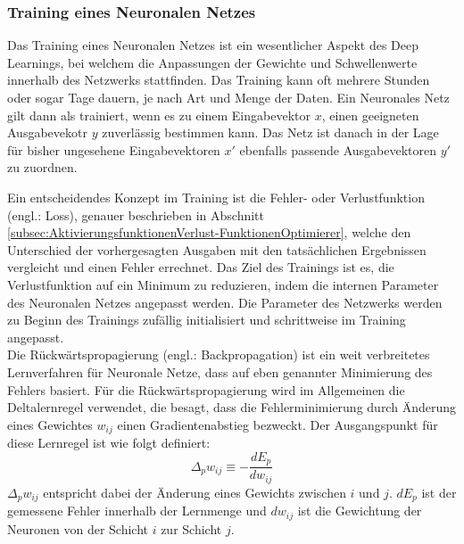 \subsubsection{Training eines Neuronalen Netzes}
Das Training eines Neuronalen Netzes ist ein wesentlicher Aspekt des Deep Learnings, bei welchem die Anpassungen der Gewichte und Schwellenwerte innerhalb des Netzwerks stattfinden. Das Training kann oft mehrere Stunden oder sogar Tage dauern, je nach Art und Menge der Daten. Ein Neuronales Netz gilt dann als trainiert, wenn es zu einem Eingabevektor $x$, einen geeigneten Ausgabevekotr $y$ zuverlässig bestimmen kann. Das Netz ist danach in der Lage für bisher ungesehene Eingabevektoren $x'$ ebenfalls passende Ausgabevektoren $y'$ zu zuordnen. \cite[vgl.][]{Scherer1997}

Ein entscheidendes Konzept im Training ist die Fehler- oder Verlustfunktion (engl.: Loss), genauer beschrieben in Abschnitt \ref{subsec:AktivierungsfunktionenVerlust-FunktionenOptimierer}, welche den Unterschied der vorhergesagten Ausgaben mit den tatsächlichen Ergebnissen vergleicht und einen Fehler errechnet. Das Ziel des Trainings ist es, die Verlustfunktion auf ein Minimum zu reduzieren, indem die internen Parameter des Neuronalen Netzes angepasst werden. Die Parameter des Netzwerks werden zu Beginn des Trainings zufällig initialisiert und schrittweise im Training angepasst. \cite[vgl.][]{Choo2020}\\
Die Rückwärtspropagierung (engl.: Backpropagation) ist ein weit verbreitetes Lernverfahren für Neuronale Netze, dass auf eben genannter Minimierung des Fehlers basiert. Für die Rückwärtspropagierung wird im Allgemeinen die Deltalernregel verwendet, die besagt, dass die Fehlerminimierung durch Änderung eines Gewichtes $w_{ij}$ einen Gradientenabstieg bezweckt. Der Ausgangspunkt für diese Lernregel ist wie folgt definiert: 
\begin{equation}
	\Delta_{p}w_{ij} \equiv -\dfrac{dE_p}{dw_{ij}}
\end{equation}
$\Delta_{p}w_{ij}$ entspricht dabei der Änderung eines Gewichts zwischen $i$ und $j$. $dE_p$ ist der gemessene Fehler innerhalb der Lernmenge und $dw_{ij}$ ist die Gewichtung der Neuronen von der Schicht $i$ zur Schicht $j$. \cite[vgl.][]{Rumelhart1986}

